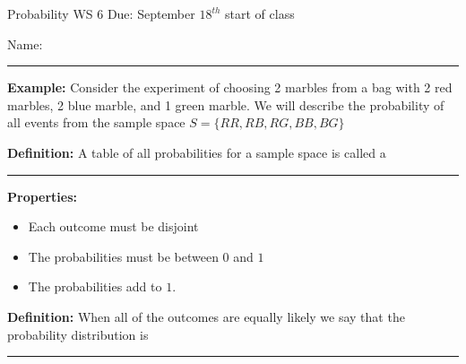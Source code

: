 \documentclass[oneside]{amsart}
\theoremstyle{definition}
\theoremstyle{definition}
\begin{document}
Probability \hfill {\huge WS 6} \hfill Due: September $18^{th}$ start of class \\
\begin{flushright}
    {\Large Name:}\rule[-1mm]{75mm}{.1mm}
\end{flushright}

 \hrulefill
\vspace{2mm}

    \textbf{Example:} Consider the experiment of choosing 2 marbles from a bag with 2 red marbles, 2 blue marble, and 1 green marble. We will describe the probability of all events from the sample space $S = \{ RR, RB, RG, BB, BG \}$

    \vfill

\begin{ovalbox}{\begin{minipage}{6.8in}
\vspace{5mm}

\textbf{Definition:} A table of all probabilities for a sample space is called a  \\
\begin{center}
   \rule[-1mm]{85mm}{.1mm}
\end{center}


\vspace{7mm}

\end{minipage}}
\end{ovalbox}

\vspace{3mm}

\textbf{Properties:}
\begin{itemize}
    \item Each outcome must be disjoint
    \item The probabilities must be between $0$ and $1$
    \item The probabilities add to $1$.
\end{itemize}

\vspace{3mm}

\begin{ovalbox}{\begin{minipage}{6.8in}
\vspace{5mm}

\textbf{Definition:} When all of the outcomes are equally likely we say that the probability distribution is   \\
\begin{center}
   \rule[-1mm]{85mm}{.1mm}
\end{center}


\vspace{7mm}

\end{minipage}}
\end{ovalbox}
\end{document}
